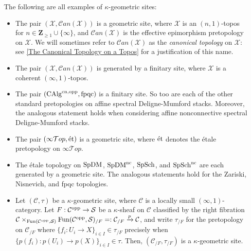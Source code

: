 \documentclass[10pt]{article}
\newcommand{\mS}{\mathcal S}
\newcommand{\C}{\mathcal C}
\newcommand{\cT}{\mathcal{T}}
\newcommand{\cX}{\mathcal{X}}
\newcommand{\ZZ}{\mathbb{Z}}
\def\ZZ{{\mathbf Z}}
\theoremstyle{witharg}
\theoremstyle{witharg}
\theoremstyle{witharg2}
\begin{document}
\begin{example}{}\label{Geom Sites Examples}

    The following are all examples of $\kappa$-geometric sites:

    \begin{itemize}
    
        \item [$(1)$] The pair $(\cX,\C an(\cX))$ is a geometric site, where $\cX$ is an $(n,1)$-topos for $n\in \ZZ_{\geq 1}\cup \{\infty\}$, and $\C an(\cX)$ is the effective epimorphism pretopology on $\cX$. We will sometimes refer to $\C an(\cX)$ as the \emph{canonical topology} on $\cX$: see \ref{The Canonical Topology on a Topos} for a justification of this name.

        \item [$(2)$] The pair $(\cX,\C an(\cX))$ is generated by a finitary site, where $\cX$ is a coherent $(\infty,1)$-topos.

        \item [$(3)$] The pair $(\textnormal{CAlg}^{\textnormal{cn},\textnormal{opp}},\textnormal{fpqc})$ is a finitary site. So too are each of the other standard pretopologies on affine spectral Deligne-Mumford stacks. Moreover, the analogous statement holds when considering affine nonconnective spectral Deligne-Mumford stacks.

        \item [$(4)$] The pair $(\infty\cT op,\textnormal{\'{e}t})$ is a geometric site, where $\textnormal{\'{e}t}$ denotes the \'{e}tale pretopology on $\infty\cT op$. 

        \item [$(5)$] The \'{e}tale topology on $\textnormal{SpDM}$, $\textnormal{SpDM}^{\textnormal{nc}}$, $\textnormal{SpSch}$, and $\textnormal{SpSch}^{\textnormal{nc}}$ are each generated by a geometric site. The analogous statements hold for the Zariski, Nisnevich, and fpqc topologies. 

     

        \item [$(6)$] Let $(\C,\tau)$ be a $\kappa$-geometric site, where $\C$ is a locally small $(\infty,1)$-category. Let $F:\C^{\textnormal{opp}}\rightarrow \mS$ be a $\kappa$-sheaf on $\C$ classified by the right fibration $\C\times_{\textnormal{Fun}(\C^{\textnormal{opp}},\mS)}\textnormal{Fun}(\C^{\textnormal{opp}},\mS)_{/F}=:\C_{/F}\xrightarrow{p} \C$, and write $\tau_{/F}$ for the pretopology on $\C_{/F}$ where $\{f_i:U_i\rightarrow X\}_{i\in I}\in \tau_{/F}$ precisely when $\{p(f_i):p(U_i)\rightarrow p(X)\}_{i\in I}\in \tau$. Then, $(\C_{/F},\tau_{/F})$ is a $\kappa$-geometric site. 
        
    \end{itemize}

    
    
\end{example}
\end{document}

